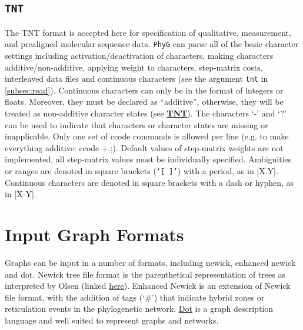 \documentclass[11pt]{book}
\newcommand{\phyg}{\texttt{PhyG} }
\begin{document}
{{	\subsection{\texttt{TNT}}
		The TNT \citep{Goloboffetal2008} format is accepted here for specification of 
		qualitative, measurement, and prealigned molecular sequence data. \phyg can 
		parse all of the basic character settings including activation/deactivation of 
		characters, making characters additive/non-additive, applying weight to characters, 
		step-matrix costs, interleaved data files and continuous characters (see the argument
		\texttt{tnt} in \ref{subsec:read}). Continuous 
		characters can only be in the format of integers or floats. Moreover, 
		they must be declared as ``additive'', otherwise, they will be treated as non-additive 
		character states (see \href{http://phylo.wikidot.com/tnt-htm}{\textbf{TNT}}).
		The characters `-' and `?' can be used to indicate that characters or character 
		states are missing or inapplicable. Only one set of ccode commands is allowed 
		per line (e.g. to make everything additive: ccode +.;). Default values of step-matrix 
		weights are not implemented, all step-matrix values must be individually specified. 
		Ambiguities or ranges are denoted in square brackets (\texttt{`[ ]'}) with a period, 
		as in [X.Y]. Continuous characters are denoted in square brackets with a dash or 
		hyphen, as in [X-Y].

\section{Input Graph Formats}
	Graphs can be input in a number of formats, including newick, enhanced newick and 
	dot. Newick tree file format is the parenthetical representation of trees as interpreted 
	by Olsen (linked \href{https://evolution.genetics.washington.edu/phylip/newick_doc.html}
	{here}). Enhanced Newick \cite{Cardonaetal2008} is an extension of Newick file 
	format, with the addition of tags (`\#') that indicate hybrid zones or reticulation events
	in the phylogenetic network. \href{https://graphviz.org/}{Dot} is a graph description 
	language and well suited to represent graphs and networks. 	
	
}}
\end{document}
